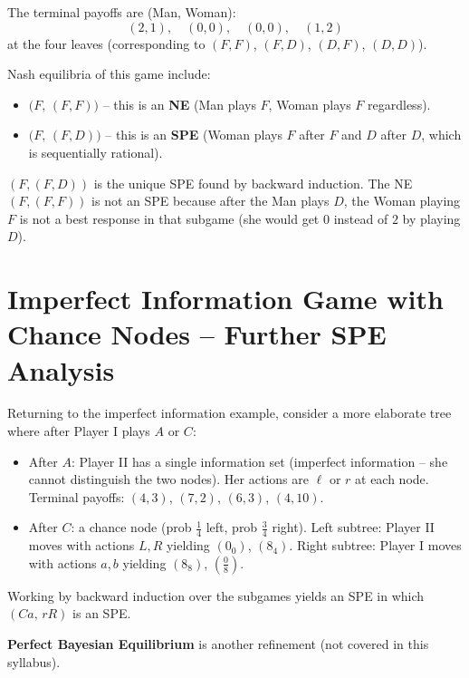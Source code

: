 \documentclass[12pt, a4paper]{article}
\begin{document}
\noindent The terminal payoffs are (Man, Woman):
\[
  (2,1),\quad (0,0),\quad (0,0),\quad (1,2)
\]
at the four leaves (corresponding to $(F,F)$, $(F,D)$, $(D,F)$, $(D,D)$).

\medskip
\noindent Nash equilibria of this game include:
\begin{itemize}
  \item $\bigl(F,\,(F,F)\bigr)$ -- this is an \textbf{NE} (Man plays $F$, Woman plays $F$ regardless).
  \item $\bigl(F,\,(F,D)\bigr)$ -- this is an \textbf{SPE} (Woman plays $F$ after $F$ and $D$ after $D$, which is sequentially rational).
\end{itemize}

\begin{notebox}
$(F,(F,D))$ is the unique SPE found by backward induction. The NE $(F,(F,F))$ is not an SPE because after the Man plays $D$, the Woman playing $F$ is not a best response in that subgame (she would get $0$ instead of $2$ by playing $D$).
\end{notebox}

\section{Imperfect Information Game with Chance Nodes -- Further SPE Analysis}

\noindent Returning to the imperfect information example, consider a more elaborate tree where after Player I plays $A$ or $C$:
\begin{itemize}
  \item After $A$: Player II has a single information set (imperfect information -- she cannot distinguish the two nodes). Her actions are $\ell$ or $r$ at each node. Terminal payoffs:
    $(4,3)$,\; $(7,2)$,\; $(6,3)$,\; $(4,10)$.
  \item After $C$: a chance node (prob $\tfrac{1}{4}$ left, prob $\tfrac{3}{4}$ right). 
    Left subtree: Player II moves with actions $L,R$ yielding $(0_0)$, $(8_4)$.
    Right subtree: Player I moves with actions $a,b$ yielding $(8_8)$, $\left(\tfrac{0}{8}\right)$.
\end{itemize}

Working by backward induction over the subgames yields an SPE in which $(Ca,\, rR)$ is an SPE.

\begin{notebox}
\textbf{Perfect Bayesian Equilibrium} is another refinement (not covered in this syllabus).
\end{notebox}
\end{document}
